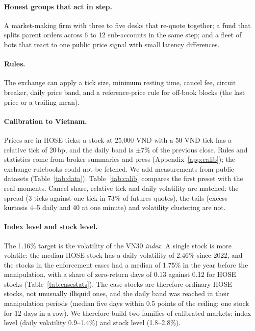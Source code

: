 \documentclass[11pt,a4paper]{article}
\begin{document}
\paragraph{Honest groups that act in step.} A market-making firm with three to five desks that re-quote together; a fund that splits parent orders across 6 to 12 sub-accounts in the same step; and a fleet of bots that react to one public price signal with small latency differences.

\paragraph{Rules.} The exchange can apply a tick size, minimum resting time, cancel fee, circuit breaker, daily price band, and a reference-price rule for off-book blocks (the last price or a trailing mean).

\paragraph{Calibration to Vietnam.} Prices are in HOSE ticks: a stock at 25,000 VND with a 50 VND tick has a relative tick of 20\,bp, and the daily band is $\pm 7\%$ of the previous close. Rules and statistics come from broker summaries and press (Appendix~\ref{app:calib}); the exchange rulebooks could not be fetched. We add measurements from public datasets (Table~\ref{tab:data}). Table~\ref{tab:calib} compares the first preset with the real moments. Cancel share, relative tick and daily volatility are matched; the spread (3 ticks against one tick in 73\% of futures quotes), the tails (excess kurtosis 4--5 daily and 40 at one minute) and volatility clustering are not.

\paragraph{Index level and stock level.} The 1.16\% target is the volatility of the VN30 \emph{index}. A single stock is more volatile: the median HOSE stock has a daily volatility of 2.46\% since 2022, and the stocks in the enforcement cases had a median of 1.75\% in the year before the manipulation, with a share of zero-return days of 0.13 against 0.12 for HOSE stocks (Table~\ref{tab:casestats}). The case stocks are therefore ordinary HOSE stocks, not unusually illiquid ones, and the daily band was reached in their manipulation periods (median five days within 0.5 points of the ceiling; one stock for 12 days in a row). We therefore build two families of calibrated markets: index level (daily volatility 0.9--1.4\%) and stock level (1.8--2.8\%).
\end{document}

